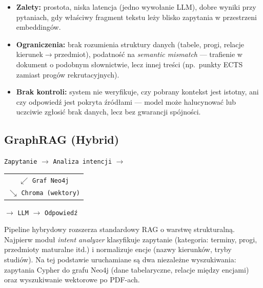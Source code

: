\begin{itemize}[leftmargin=*]
    \item \textbf{Zalety:} prostota, niska latencja (jedno wywołanie LLM), dobre wyniki przy pytaniach,
          gdy właściwy fragment tekstu leży blisko zapytania w przestrzeni embeddingów.
    \item \textbf{Ograniczenia:} brak rozumienia struktury danych (tabele, progi, relacje kierunek$\rightarrow$przedmiot),
          podatność na \textit{semantic mismatch} --- trafienie w dokument o podobnym słownictwie, lecz innej treści
          (np.\ punkty ECTS zamiast progów rekrutacyjnych).
    \item \textbf{Brak kontroli:} system nie weryfikuje, czy pobrany kontekst jest istotny, ani czy odpowiedź
          jest pokryta źródłami --- model może halucynować lub uczciwie zgłosić brak danych, lecz bez gwarancji spójności.
\end{itemize}

\vspace{1em}

\subsection*{GraphRAG (Hybrid)}

\begin{tcolorbox}[colback=gray!5!white,colframe=gray!60!black,title=Przepływ danych --- pipeline liniowy z dwoma źródłami]
    \centering
    \texttt{Zapytanie} $\rightarrow$ \texttt{Analiza intencji} $\rightarrow$
    \begin{tabular}{c}
        $\swarrow$ \texttt{Graf Neo4j} \\
        $\searrow$ \texttt{Chroma (wektory)}
    \end{tabular}
    $\rightarrow$ \texttt{LLM} $\rightarrow$ \texttt{Odpowiedź}
\end{tcolorbox}

\noindent
Pipeline hybrydowy rozszerza standardowy RAG o warstwę strukturalną.
Najpierw moduł \textit{intent analyzer} klasyfikuje zapytanie (kategoria: terminy, progi, przedmioty maturalne itd.)
i normalizuje encje (nazwy kierunków, tryby studiów). Na tej podstawie uruchamiane są dwa niezależne wyszukiwania:
zapytania Cypher do grafu Neo4j (dane tabelaryczne, relacje między encjami) oraz wyszukiwanie wektorowe po PDF-ach.

